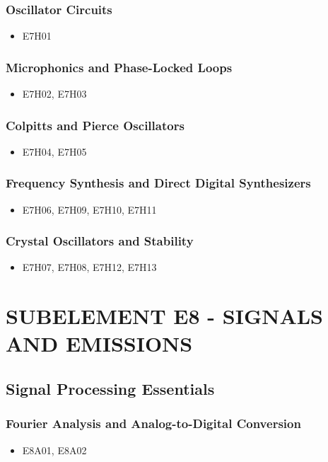 \documentclass{book}
\begin{document}
\subsection{Oscillator Circuits}
\begin{itemize}
    \item E7H01
\end{itemize}
\subsection{Microphonics and Phase-Locked Loops}
\begin{itemize}
    \item E7H02, E7H03
\end{itemize}
\subsection{Colpitts and Pierce Oscillators}
\begin{itemize}
    \item E7H04, E7H05
\end{itemize}
\subsection{Frequency Synthesis and Direct Digital Synthesizers}
\begin{itemize}
    \item E7H06, E7H09, E7H10, E7H11
\end{itemize}
\subsection{Crystal Oscillators and Stability}
\begin{itemize}
    \item E7H07, E7H08, E7H12, E7H13
\end{itemize}

\chapter{SUBELEMENT E8 - SIGNALS AND EMISSIONS}

\section{Signal Processing Essentials}
\subsection{Fourier Analysis and Analog-to-Digital Conversion}
\begin{itemize}
    \item E8A01, E8A02
\end{itemize}
\end{document}
